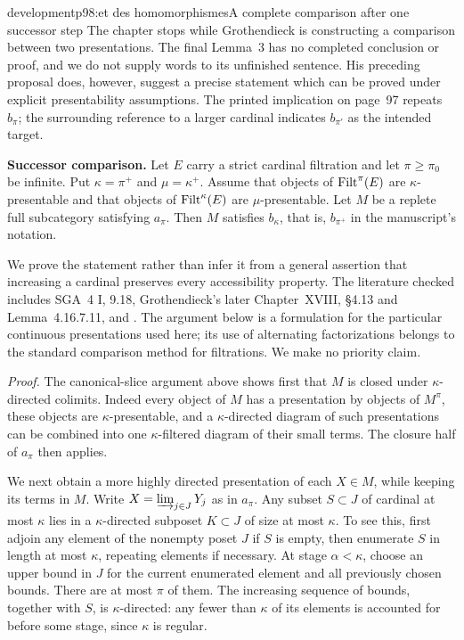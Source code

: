 \begin{dcomment}{development}{p98:et des homomorphismes}{A complete comparison after one successor step}
The chapter stops while Grothendieck is constructing a comparison between two presentations. The final Lemma~3 has no completed conclusion or proof, and we do not supply words to its unfinished sentence. His preceding proposal does, however, suggest a precise statement which can be proved under explicit presentability assumptions. The printed implication on page~97 repeats $b_\pi$; the surrounding reference to a larger cardinal indicates $b_{\pi'}$ as the intended target.

\textbf{Successor comparison.}\ours
Let $E$ carry a strict cardinal filtration and let $\pi\geq\pi_0$ be infinite. Put $\kappa=\pi^+$ and $\mu=\kappa^+$. Assume that objects of $\mathrm{Filt}^\pi(E)$ are $\kappa$-presentable and that objects of $\mathrm{Filt}^\kappa(E)$ are $\mu$-presentable. Let $M$ be a replete full subcategory satisfying $a_\pi$. Then $M$ satisfies $b_\kappa$, that is, $b_{\pi^+}$ in the manuscript's notation.

We prove the statement rather than infer it from a general assertion that increasing a cardinal preserves every accessibility property. The literature checked includes SGA~4 I, 9.18, Grothendieck's later Chapter~XVIII, \S4.13 and Lemma~4.16.7.11, and \citet[\S8]{LiebermanRosickyVasey2020}. The argument below is a formulation for the particular continuous presentations used here; its use of alternating factorizations belongs to the standard comparison method for filtrations. We make no priority claim.

\emph{Proof.} The canonical-slice argument above shows first that $M$ is closed under $\kappa$-directed colimits. Indeed every object of $M$ has a presentation by objects of $M^\pi$, these objects are $\kappa$-presentable, and a $\kappa$-directed diagram of such presentations can be combined into one $\kappa$-filtered diagram of their small terms. The closure half of $a_\pi$ then applies.

We next obtain a more highly directed presentation of each $X\in M$, while keeping its terms in $M$. Write $X=\varinjlim_{j\in J}Y_j$ as in $a_\pi$. Any subset $S\subset J$ of cardinal at most $\kappa$ lies in a $\kappa$-directed subposet $K\subset J$ of size at most $\kappa$. To see this, first adjoin any element of the nonempty poset $J$ if $S$ is empty, then enumerate $S$ in length at most $\kappa$, repeating elements if necessary. At stage $\alpha<\kappa$, choose an upper bound in $J$ for the current enumerated element and all previously chosen bounds. There are at most $\pi$ of them. The increasing sequence of bounds, together with $S$, is $\kappa$-directed: any fewer than $\kappa$ of its elements is accounted for before some stage, since $\kappa$ is regular.


\end{dcomment}
